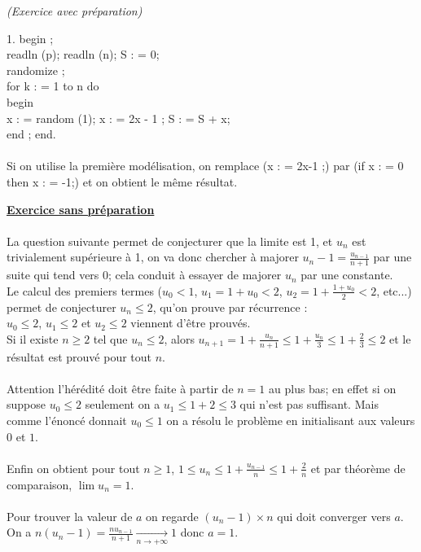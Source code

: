 \documentclass[11pt]{article}%
\begin{document}
\begin{exercice}{\it (Exercice avec préparation)}
\begin{noliste}{1.}
 begin ; \\
 readln (p); readln (n); S : = 0; \\
randomize ;\\
 for k : = 1 to n do \\
 begin \\
 x : = random (1); x : = 2x - 1 ; S : = S + x; \\
 end ; end. \\
\\
 Si on utilise la première modélisation, on remplace (x : = 2x-1 ;) par
(if x : = 0 then x : = -1;) et on obtient le même résultat.
 \\
 \end{noliste}
 \noindent \textbf{\underline{Exercice sans préparation}} \\
\\
 La question suivante permet de conjecturer que la limite est 1, et
$u_{n}$ est trivialement supérieure à 1, on va donc chercher à majorer
$u_{n} -1 = \frac{u_{n-1}}{n + 1}$ par une suite qui tend vers 0; cela
conduit à essayer de majorer $u_{n}$ par une constante. \\
 Le calcul des premiers termes ($u_{0} < 1$, $u_{1} = 1 + u_{0} < 2$,
$u_{2} = 1 + \frac{1 + u_{0}}{2} < 2$, etc...) permet de conjecturer
$u_{n} \leq 2$, qu'on prouve par récurrence : \\
 $u_{0} \leq 2$, $u_{1} \leq 2$ et $u_{2} \leq 2$ viennent d'être
prouvés. \\
 Si il existe $n \geq 2$ tel que $u_{n} \leq 2$, alors $u_{n + 1} = 1 +
\frac{u_{n}}{n + 1} \leq 1 + \frac{u_{n}}{3} \leq 1 + \frac{2}{3} \leq
2$ et le résultat est prouvé pour tout $n$. \\
\\
 Attention l'hérédité doit être faite à partir de $n = 1$ au plus bas;
en effet si on suppose $u_{0} \leq 2$ seulement on a $u_{1} \leq 1 + 2
\leq 3$ qui n'est pas suffisant. Mais comme l'énoncé donnait $u_{0}
\leq 1$ on a résolu le problème en initialisant aux valeurs $0$ et $1$.
\\
\\
 Enfin on obtient pour tout $n \geq 1$, $1 \leq u_{n} \leq 1 +
\frac{u_{n-1} }{n} \leq 1 + \frac{2}{n}$ et par théorème de
comparaison, $\lim u_{n} = 1$.
 \\
\\
 Pour trouver la valeur de $a$ on regarde $ (u_{n} -1) \times n$ qui
doit converger vers $a$. \\
 On a $n (u_{n} - 1) = \frac{n u_{n-1} }{n + 1} \xrightarrow[ n
\rightarrow + \infty]{} 1$ donc $a = 1$. \\

\end{exercice}
\end{document}
